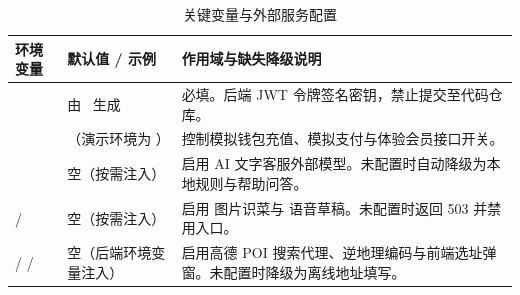 \begin{longtable}{L{.30\linewidth}L{.266\linewidth}L{.395\linewidth}}
\caption{关键变量与外部服务配置}\label{tab:deploy-env}\\
\toprule
\textbf{环境变量} & \textbf{默认值 / 示例} & \textbf{作用域与缺失降级说明} \\
\midrule
{} & 由 \mbox{ 生成} & 必填。后端 JWT 令牌签名密钥，禁止提交至代码仓库。 \\
 & （演示环境为 ） & 控制模拟钱包充值、模拟支付与体验会员接口开关。 \\
 & 空（按需注入） & 启用 AI 文字客服外部模型。未配置时自动降级为本地规则与帮助问答。 \\
 /  & 空（按需注入） & 启用  图片识菜与  语音草稿。未配置时返回 503 并禁用入口。 \\
 /  /  & 空（\mbox{后端环境变量注入}） & 启用高德 POI 搜索代理、逆地理编码与前端选址弹窗。未配置时降级为离线地址填写。 \\
\bottomrule
\end{longtable}


\endgroup
